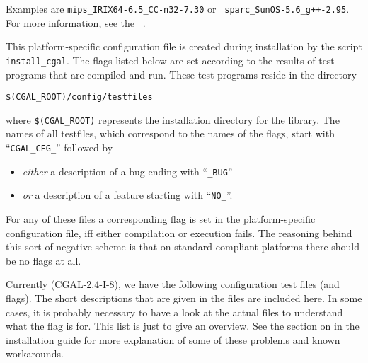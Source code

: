 \noindent Examples are \texttt{mips\_IRIX64-6.5\_CC-n32-7.30} or {\tt
  sparc\_SunOS-5.6\_g++-2.95}. For more information, see the \cgal\ 
.
\ccIndexSubitemEnd{flag}{for OS \& compiler}

This platform-specific configuration file is created during
installation by the script \texttt{install\_cgal}. The flags listed below
are set according to the results of test programs that are compiled and run.
These test programs reside in the directory
\begin{center}
\verb|$(CGAL_ROOT)/config/testfiles|
\end{center}
where \verb|$(CGAL_ROOT)| represents the installation directory for the library.
The names of all testfiles, which correspond to the names of the flags, 
\ccIndexSubitem{workaround flags}{names}
start with ``\texttt{CGAL\_CFG\_}'' followed by
\begin{itemize}
\item \textit{either} a description of a bug ending with
  ``\texttt{\_BUG}''
\item \textit{or} a description of a feature starting with
  ``\texttt{NO\_}''.
\end{itemize}
For any of these files a corresponding flag is set in the 
platform-specific configuration file, iff either compilation or execution
fails. The reasoning behind this sort of negative scheme is that on
standard-compliant platforms there should be no flags at all.


\noindent Currently (CGAL-2.4-I-8), we have the following configuration
test files (and flags). The short descriptions that are given in the files are 
included here. In some cases, it is probably necessary to have a look at the
actual files to understand what the flag is for. This list is just to
give an overview.  See the section on
 in the installation guide
for more explanation of some of these problems and known workarounds. 

